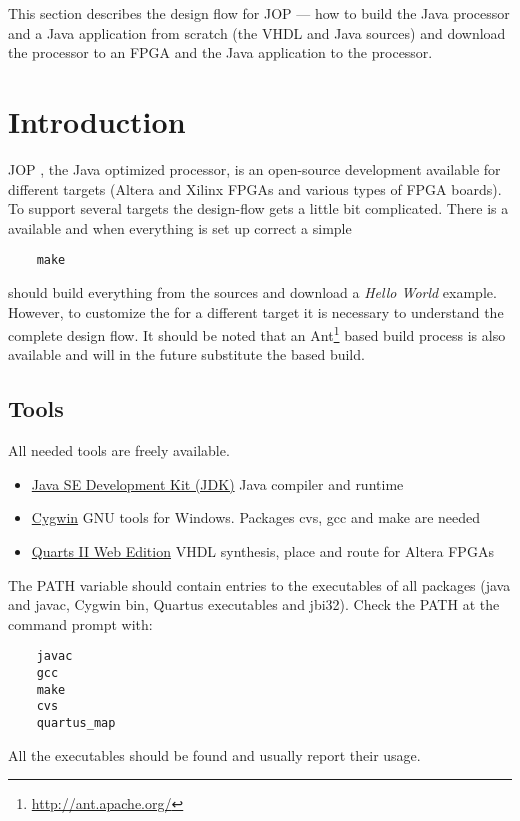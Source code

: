 
This section describes the design flow for JOP --- how to build the
Java processor and a Java application from scratch (the VHDL and
Java sources) and download the processor to an FPGA and the Java
application to the processor.


\section{Introduction}

JOP \cite{jop:thesis}, the Java optimized processor, is an
open-source development available for different targets (Altera and
Xilinx FPGAs and various types of FPGA boards). To support several
targets the design-flow gets a little bit complicated. There is a
 available and when everything is set up correct a
simple
%
\begin{verbatim}
    make
\end{verbatim}
%
should build everything from the sources and download a \emph{Hello
World} example. However, to customize the  for a
different target it is necessary to understand the complete design
flow. It should be noted that an
Ant\footnote{\url{http://ant.apache.org/}} based build process is
also available and will in the future substitute the 
based build.

\subsection{Tools}

All needed tools are freely available.
%
\begin{itemize}
    \item  \href{http://java.sun.com/javase/downloads/index.jsp}%
{Java SE Development Kit (JDK)}  Java compiler and runtime
    \item  \href{http://www.cygwin.com/}%
{Cygwin} GNU tools for Windows. Packages cvs, gcc and make are
needed
    \item  \href{https://www.altera.com/support/software/download/altera_design/quartus_we/dnl-quartus_we.jsp}%
{Quarts II Web Edition} VHDL synthesis, place and route for Altera
FPGAs

\end{itemize}
%
The PATH variable should contain entries to the executables of all
packages (java and javac, Cygwin bin, Quartus executables and
jbi32). Check the PATH at the command prompt with:
%
\begin{verbatim}
    javac
    gcc
    make
    cvs
    quartus_map
\end{verbatim}
%
All the executables should be found and usually report their usage.


